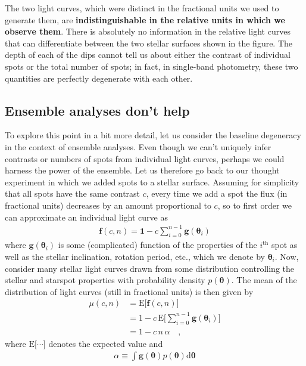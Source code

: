 \documentclass[modern]{aastex62}
\begin{document}
The two light curves, which were distinct in the fractional units we used
to generate them, are \textbf{indistinguishable in the relative units
    in which we observe them}. There is absolutely no information in the
relative light curves that can differentiate between the two stellar
surfaces shown in the figure. The depth of each of the dips cannot tell
us about either the contrast of individual spots or the total number of spots;
in fact, in single-band photometry, these two quantities are perfectly
degenerate with each other.

\subsection{Ensemble analyses don't help}
\label{sec:basic-gp}
%
To explore this point in a bit more detail, let us consider the baseline
degeneracy in the context of ensemble analyses. Even though we can't
uniquely infer contrasts or numbers of spots from individual light curves,
perhaps we could harness the power of the ensemble.
%
Let us therefore go
back to our thought experiment in which we added spots to a stellar
surface. Assuming for simplicity that all spots have the same contrast $c$,
every time we add a spot the flux (in fractional units)
decreases by an amount proportional to $c$, so to first order we can approximate an
individual light curve as
%
\begin{align}
    \mathbf{f}(c, n) = \mathbf{1} - c \sum_{i=0}^{n-1} \mathbf{g}(\pmb{\theta}_i)
\end{align}
%
where $\mathbf{g}(\pmb{\theta}_i)$ is some (complicated) function of the properties
of the $i^\mathrm{th}$ spot
as well as the stellar inclination, rotation period, etc., which we
denote by $\pmb{\theta}_i$.
Now, consider many stellar light curves drawn from some distribution
controlling the stellar and starspot properties with probability density
$p(\pmb{\theta})$.
%
The mean of the distribution of
light curves (still in fractional units) is then given by
%
\begin{align}
    \mu(c, n) & = \mathrm{E} \Big[ \mathbf{f} (c, n) \Big] \nonumber                                      \\
              & = 1 - c \, \mathrm{E} \bigg[ \sum_{i=0}^{n-1} \mathbf{g}(\pmb{\theta}_i) \bigg] \nonumber \\
              & = 1 - c \, n \, \alpha
    \quad,
\end{align}
%
where $\mathrm{E}\big[\cdots\big]$ denotes the expected value and
%
\begin{align}
    \alpha \equiv \int \mathbf{g} (\pmb{\theta}) p(\pmb{\theta}) \mathrm{d} \pmb{\theta}
\end{align}
\end{document}
